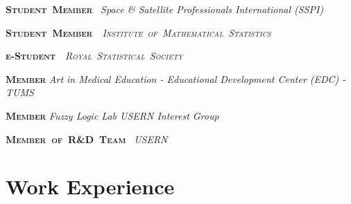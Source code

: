 \documentclass{Asgharpoor_cv}
\begin{document}
 \begin{small} \mbox {\scshape \textbf{Student Member} \cpshalf}
        { \selectfont \footnotesize \emph{Space \& Satellite Professionals International (SSPI)}}
 \end{small}
 
 \begin{small} \mbox {\scshape \textbf{Student Member}\cpshalf
        { \selectfont \footnotesize \emph{Institute of Mathematical Statistics}}}
 \end{small}
 
\begin{small} \mbox {\scshape \textbf{e-Student}\cpshalf
        { \selectfont \footnotesize \emph{ Royal Statistical Society}}}
\end{small}

\begin{small} \mbox {\scshape \textbf{Member}\cpshalf}
    	{ \selectfont \footnotesize \emph{Art in Medical Education - Educational Development Center (EDC) - TUMS}}
\end{small}

\begin{small} \mbox {\scshape\textbf{Member}\cpshalf}
        { \selectfont \footnotesize \emph{Fuzzy Logic Lab USERN Interest Group}}
 \end{small}
 
 \begin{small} \mbox {\scshape \textbf{Member of R\&D Team} \cpshalf}
        { \selectfont \footnotesize \emph{USERN} }
 \end{small} 
\newline
\section{Work Experience}
%
\end{document}

